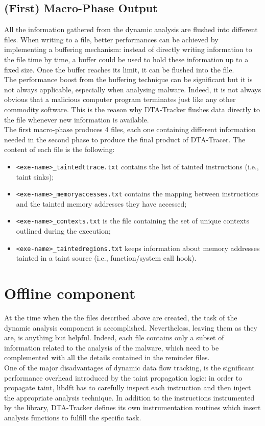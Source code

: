 \documentclass[LaM,binding=0.6cm]{sapthesis}
\begin{document}
\subsection{(First) Macro-Phase Output}
All the information gathered from the dynamic analysis are flushed into different files. When writing to a file, better performances can be achieved by implementing a buffering mechanism: instead of directly writing information to the file time by time, a buffer could be used to hold these information up to a fixed size. Once the buffer reaches its limit, it can be flushed into the file.\\
The performance boost from the buffering technique can be significant but it is not always applicable, especially when analysing malware. Indeed, it is not always obvious that a malicious computer program terminates just like any other commodity software. This is the reason why DTA-Tracker flushes data directly to the file whenever new information is available.\\

The first macro-phase produces 4 files, each one containing different information needed in the second phase to produce the final product of DTA-Tracer. The content of each file is the following:
\begin{itemize}
\item \texttt{<exe-name>\_taintedttrace.txt} contains the list of tainted instructions (i.e., taint sinks);
\item \texttt{<exe-name>\_memoryaccesses.txt} contains the mapping between instructions and the tainted memory addresses they have accessed;
\item \texttt{<exe-name>\_contexts.txt} is the file containing the set of unique contexts outlined during the execution;
\item \texttt{<exe-name>\_taintedregions.txt} keeps information about memory addresses tainted in a taint source (i.e., function/system call hook).
\end{itemize}

\section{Offline component}
At the time when the the files described above are created, the task of the dynamic analysis component is accomplished. Nevertheless, leaving them as they are, is anything but helpful. Indeed, each file contains only a subset of information related to the analysis of the malware, which need to be complemented with all the details contained in the reminder files.\\
One of the major disadvantages of dynamic data flow tracking, is the significant performance overhead introduced by the taint propagation logic: in order to propagate taint, libdft has to carefully inspect each instruction and then inject the appropriate analysis technique. In addition to the instructions instrumented by the library, DTA-Tracker defines its own instrumentation routines which insert analysis functions to fulfill the specific task.\\
\end{document}
